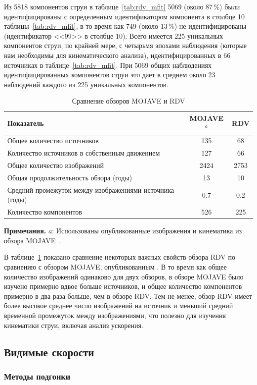 Из 5818 компонентов струи в таблице~\ref{tab:rdv_mfit} 5069 (около 87\,\%) были идентифицированы с
определенным идентификатором компонента в столбце 10 таблицы~\ref{tab:rdv_mfit}, в то время как 749
(около 13\,\%) не идентифицированы (идентификатор <<99>> в столбце 10). Всего имеется 225 уникальных
компонентов струи, по крайней мере, с четырьмя эпохами наблюдения (которые нам необходимы для
кинематического анализа), идентифицированных в 66 источниках в таблице~\ref{tab:rdv_mfit}. При 5069
общих наблюдениях идентифицированных компонентов струи это дает в среднем около 23 наблюдений
каждого из 225 уникальных компонентов.

\begin{table}
\caption{Сравнение обзоров MOJAVE и RDV}
\label{tab:rdv_comptab}
\small
\centering
\begin{tabular}{l c c}
\toprule
Показатель & MOJAVE$^{a}$ & RDV \\
\midrule
Общее количество источников                             & 135  & 68   \\
Количество источников в собственным движением           & 127  & 66   \\
Общее количество изображений                            & 2424 & 2753 \\
Общая продолжительность обзора (годы)                   & 13   & 10   \\
Средний промежуток между изображениями источника (годы) & 0.7  & 0.2  \\
Количество компонентов                                  & 526  & 225  \\
\bottomrule
\end{tabular}

\textbf{Примечания.}
$a$: Использованы опубликованные изображения и кинематика из обзора
MOJAVE~\cite{Lister_2009a,Lister_2009b}.
\end{table}

В таблице~\ref{tab:rdv_comptab} показано сравнение некоторых важных свойств обзора RDV по сравнению
с обзором MOJAVE, опубликованным \cite{Lister_2009a,Lister_2009b}. В то время как общее количество
изображений одинаково для двух обзоров, в обзоре MOJAVE было изучено примерно вдвое больше
источников, и общее количество компонентов примерно в два раза больше, чем в обзоре RDV. Тем не
менее, обзор RDV имеет более высокое среднее число изображений на источник и меньший средний
временной промежуток между изображениями, что полезно для изучения кинематики струи, включая анализ
ускорения.


\subsection{Видимые скорости}

\subsubsection{Методы подгонки}

